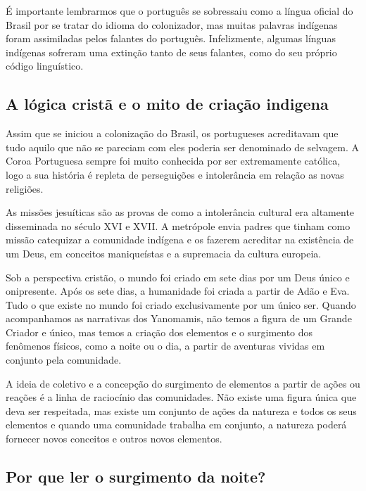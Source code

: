 \documentclass[12pt]{extarticle}
\begin{document}

É importante lembrarmos que o português se sobressaiu como a língua
oficial do Brasil por se tratar do idioma do colonizador, mas muitas
palavras indígenas foram assimiladas pelos falantes do português.
Infelizmente, algumas línguas indígenas sofreram uma extinção tanto de
seus falantes, como do seu próprio código linguístico.

\subsection{A lógica cristã e o mito de criação indigena}

Assim que se iniciou a colonização do Brasil, os portugueses acreditavam
que tudo aquilo que não se pareciam com eles poderia ser denominado de
selvagem. A Coroa Portuguesa sempre foi muito conhecida por ser
extremamente católica, logo a sua história é repleta de perseguições e
intolerância em relação as novas religiões.

As missões jesuíticas são as provas de como a intolerância cultural era
altamente disseminada no século XVI e XVII. A metrópole envia padres que
tinham como missão catequizar a comunidade indígena e os fazerem
acreditar na existência de um Deus, em conceitos maniqueístas e a
supremacia da cultura europeia.

Sob a perspectiva cristão, o mundo foi criado em sete dias por um Deus
único e onipresente. Após os sete dias, a humanidade foi criada a partir
de Adão e Eva. Tudo o que existe no mundo foi criado exclusivamente por
um único ser. Quando acompanhamos as narrativas dos Yanomamis, não temos
a figura de um Grande Criador e único, mas temos a criação dos elementos
e o surgimento dos fenômenos físicos, como a noite ou o dia, a partir de
aventuras vividas em conjunto pela comunidade.

A ideia de coletivo e a concepção do surgimento de elementos a partir de
ações ou reações é a linha de raciocínio das comunidades. Não existe uma
figura única que deva ser respeitada, mas existe um conjunto de ações da
natureza e todos os seus elementos e quando uma comunidade trabalha em
conjunto, a natureza poderá fornecer novos conceitos e outros novos
elementos.

\subsection{Por que ler o surgimento da noite?}
\end{document}
